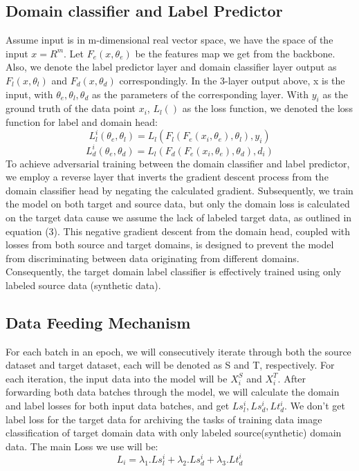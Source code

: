 \documentclass[sigconf,authordraft]{acmart}
\begin{document}
\subsection{Domain classifier and Label Predictor}
\noindent Assume input is in m-dimensional real vector space, we have the space of the input \(x = R^m\). Let \(F_e(x, \theta_e)\) be the features map we get from the backbone. Also, we denote the label predictor layer and domain classifier layer output as \(F_l(x, \theta_l)\) and \(F_d(x, \theta_d)\) correspondingly. In the 3-layer output above, x is the input, with \(\theta_e, \theta_l, \theta_d\) as the parameters of the corresponding layer. With \(y_i\) as the ground truth of the data point \(x_i\), \(L_l()\) as the loss function, we denoted the loss function for label and domain head:
\begin{equation}
  L_l^i(\theta_e, \theta_l) = L_l(F_l(F_e(x_i, \theta_e), \theta_l), y_i)
\end{equation}
\begin{equation}
  L_d^i(\theta_e, \theta_d) = L_l(F_d(F_e(x_i, \theta_e), \theta_d), d_i)
\end{equation}
\noindent To achieve adversarial training between the domain classifier and label predictor, we employ a reverse layer that inverts the gradient descent process from the domain classifier head by negating the calculated gradient. Subsequently, we train the model on both target and source data, but only the domain loss is calculated on the target data cause we assume the lack of labeled target data, as outlined in equation (3). This negative gradient descent from the domain head, coupled with losses from both source and target domains, is designed to prevent the model from discriminating between data originating from different domains. Consequently, the target domain label classifier is effectively trained using only labeled source data (synthetic data).
\subsection{Data Feeding Mechanism}
\noindent For each batch in an epoch, we will consecutively iterate through both the source dataset and target dataset, each will be denoted as S and T, respectively. For each iteration, the input data into the model will be \(X^S_i\) and \(X^T_i\). After forwarding both data batches through the model, we will calculate the domain and label losses for both input data batches, and get \(Ls_l^i, Ls_d^i, Lt_d^i\). We don't get label loss for the target data for archiving the tasks of training data image classification of target domain data with only labeled source(synthetic) domain data.
The main Loss we use will be:
\begin{equation}
  L_i = \lambda_1.Ls_l^i + \lambda_2.Ls_d^i + \lambda_3.Lt_d^i
\end{equation}
\end{document}
